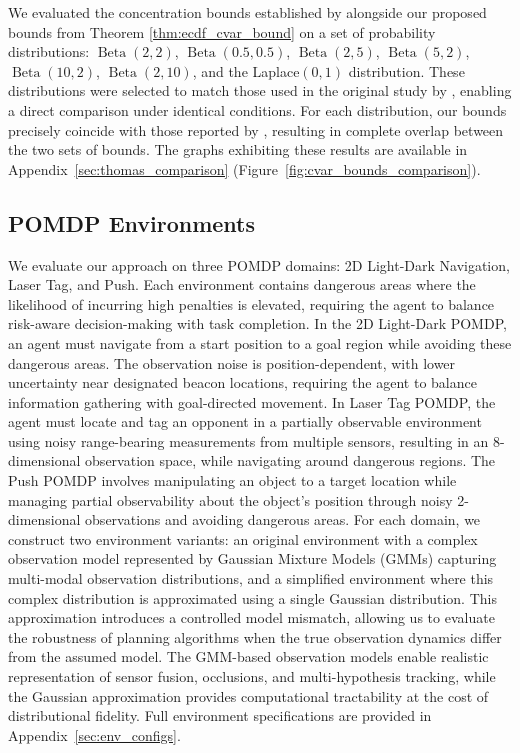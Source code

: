 \documentclass[acmlarge, manuscript, screen, review, natbib=false, oneside]{acmart}
\begin{document}
We evaluated the concentration bounds established by \cite{pmlr-v97-thomas19a} alongside our proposed bounds from Theorem \ref{thm:ecdf_cvar_bound} on a set of probability distributions: $\operatorname{Beta}(2, 2)$, $\operatorname{Beta}(0.5, 0.5)$, $\operatorname{Beta}(2, 5)$, $\operatorname{Beta}(5, 2)$, $\operatorname{Beta}(10, 2)$, $\operatorname{Beta}(2, 10)$, and the Laplace$(0, 1)$ distribution. These distributions were selected to match those used in the original study by \cite{pmlr-v97-thomas19a}, enabling a direct comparison under identical conditions. For each distribution, our bounds precisely coincide with those reported by \cite{pmlr-v97-thomas19a}, resulting in complete overlap between the two sets of bounds. The graphs exhibiting these results are available in Appendix~\ref{sec:thomas_comparison} (Figure~\ref{fig:cvar_bounds_comparison}).

\subsection{POMDP Environments}
We evaluate our approach on three POMDP domains: 2D Light-Dark Navigation, Laser Tag, and Push. Each environment contains dangerous areas where the likelihood of incurring high penalties is elevated, requiring the agent to balance risk-aware decision-making with task completion. In the 2D Light-Dark POMDP, an agent must navigate from a start position to a goal region while avoiding these dangerous areas. The observation noise is position-dependent, with lower uncertainty near designated beacon locations, requiring the agent to balance information gathering with goal-directed movement. In Laser Tag POMDP, the agent must locate and tag an opponent in a partially observable environment using noisy range-bearing measurements from multiple sensors, resulting in an 8-dimensional observation space, while navigating around dangerous regions. The Push POMDP involves manipulating an object to a target location while managing partial observability about the object's position through noisy 2-dimensional observations and avoiding dangerous areas. For each domain, we construct two environment variants: an original environment with a complex observation model represented by Gaussian Mixture Models (GMMs) capturing multi-modal observation distributions, and a simplified environment where this complex distribution is approximated using a single Gaussian distribution. This approximation introduces a controlled model mismatch, allowing us to evaluate the robustness of planning algorithms when the true observation dynamics differ from the assumed model. The GMM-based observation models enable realistic representation of sensor fusion, occlusions, and multi-hypothesis tracking, while the Gaussian approximation provides computational tractability at the cost of distributional fidelity. Full environment specifications are provided in Appendix~\ref{sec:env_configs}.
\end{document}
